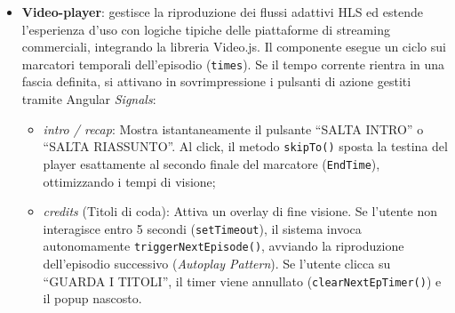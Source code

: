 \documentclass[11pt,a4paper]{article}
\begin{document}
\begin{itemize}
    \begin{itemize}
        \item \textit{Stato Portrait (Iconografico)}: Ottimizzato per le griglie di esplorazione verticali, mappa l'URI della miniatura della locandina (\texttt{ThumbnailURI}) elaborandola tramite la pipe di risoluzione dell'host backend;
        \item \textit{Stato Landscape (Cronologico)}: Configurato per i caroselli orizzontali. Oltre a modificare l'asset visivo in formato panoramico (\texttt{BannerURI}), introduce dinamicamente il componente per il tracciamento dello stato di visione. Leggendo il metadato \texttt{Progress} iniettato dal server, il sistema calcola la percentuale lineare e aggiorna in tempo reale lo stile CSS del riempimento della barra di avanzamento (\texttt{progress-bar-fill}).
    \end{itemize}
    Per assicurare la massima accuratezza delle interazioni, tutti i metodi delegati alle azioni utente (\texttt{onPlay}, \texttt{onInfo}, \texttt{onRemove}, \texttt{onDismiss}) gestiscono l'oggetto nativo \texttt{Event} del DOM. L'invocazione sistematica del metodo \texttt{event.stopPropagation()}, interrompe il fenomeno della propagazione degli eventi verso l'alto prevenendo l'attivazione simultanea e conflittuale di più eventi di rotta.
    \item \textbf{Video-player}: gestisce la riproduzione dei flussi adattivi HLS ed estende l'esperienza d'uso con logiche tipiche delle piattaforme di streaming commerciali, integrando la libreria Video.js. Il componente esegue un ciclo sui marcatori temporali dell'episodio (\texttt{times}). Se il tempo corrente rientra in una fascia definita, si attivano in sovrimpressione i pulsanti di azione gestiti tramite Angular \textit{Signals}:
    \begin{itemize}
        \item \textit{intro / recap}: Mostra istantaneamente il pulsante ``SALTA INTRO'' o ``SALTA RIASSUNTO''. Al click, il metodo \texttt{skipTo()} sposta la testina del player esattamente al secondo finale del marcatore (\texttt{EndTime}), ottimizzando i tempi di visione;
        \item \textit{credits} (Titoli di coda): Attiva un overlay di fine visione. Se l'utente non interagisce entro 5 secondi (\texttt{setTimeout}), il sistema invoca autonomamente \texttt{triggerNextEpisode()}, avviando la riproduzione dell'episodio successivo (\textit{Autoplay Pattern}). Se l'utente clicca su ``GUARDA I TITOLI'', il timer viene annullato (\texttt{clearNextEpTimer()}) e il popup nascosto.

\end{itemize}
\end{itemize}
\end{document}
